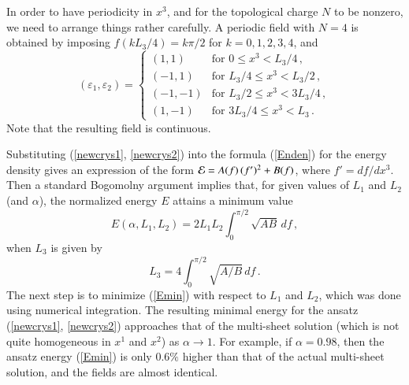 \documentclass[5p]{elsarticle}
\newcommand{\ve}{\varepsilon}
\begin{document}
In order to have periodicity in $x^3$, and for the topological charge $N$ to
be nonzero, we need to arrange things rather carefully. A periodic
field with $N=4$ is obtained by imposing $f(kL_3/4)=k\pi/2$ for $k=0,1,2,3,4$,
and
%
\begin{equation*}
  (\ve_1,\ve_2)=\left\{
   \begin{array}{ll}
       (1,1) & \mbox{for $0\leq x^3 < L_3/4$}\,, \\
       (-1,1) & \mbox{for $L_3/4\leq x^3 < L_3/2$}\,, \\
       (-1,-1) & \mbox{for $L_3/2\leq x^3 < 3L_3/4$}\,, \\
       (1,-1) & \mbox{for $3L_3/4\leq x^3 < L_3$}\,.
   \end{array}\right.
\end{equation*}
%
Note that the resulting field is continuous.

Substituting (\ref{newcrys1}, \ref{newcrys2}) into the formula (\ref{Enden})
for the energy density gives an expression of the form ${\cal E}=A(f)\,(f')^2+B(f)$,
where $f'=df/dx^3$. Then a standard Bogomolny argument implies that, for given
values of $L_1$ and $L_2$ (and $\alpha$), the normalized energy $E$ attains a
minimum value
%
\begin{equation} \label{Emin}
  E(\alpha,L_1,L_2) = 2 L_1 L_2 \int_0^{\pi/2}\sqrt{AB}\,df\,,
\end {equation}
%
when $L_3$ is given by
%
\begin{equation} \label{Lzmin}
  L_3 = 4\int_0^{\pi/2}\sqrt{A/B}\,df\,.
\end {equation}
%
The next step is to minimize (\ref{Emin}) with respect to $L_1$ and $L_2$,
which was done using numerical integration. The resulting minimal energy
for the ansatz (\ref{newcrys1}, \ref{newcrys2}) approaches that of the
multi-sheet solution (which is not quite homogeneous in $x^1$ and $x^2$)
as $\alpha\to1$. For example, if $\alpha=0.98$, then the ansatz energy
(\ref{Emin}) is only $0.6\%$ higher than that of the actual multi-sheet
solution, and the fields are almost identical.
\end{document}
